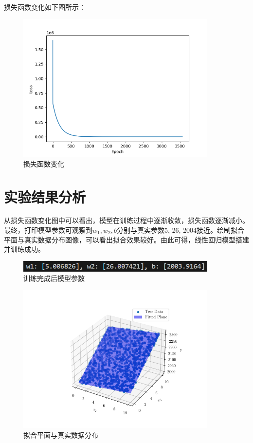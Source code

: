 \documentclass[UTF8,a4paper,12pt]{ctexart}
\begin{document}
损失函数变化如下图所示：

\begin{figure}[H]   %
  \centering
   \includegraphics[width=10cm]{picture2.png}
   \caption{损失函数变化}
\end{figure}

\section{实验结果分析}
从损失函数变化图中可以看出，模型在训练过程中逐渐收敛，损失函数逐渐减小。最终，打印模型参数可观察到$w_1, w_2, b$分别与真实参数5, 26, 2004接近。绘制拟合平面与真实数据分布图像，可以看出拟合效果较好。由此可得，线性回归模型搭建并训练成功。

\begin{figure}[H]   %
  \centering
   \includegraphics[width=10cm]{picture3.png}
   \caption{训练完成后模型参数}
\end{figure}

\begin{figure}[H]   %
  \centering
   \includegraphics[width=10cm]{picture4.png}
   \caption{拟合平面与真实数据分布}
\end{figure}

 
\end{document}
